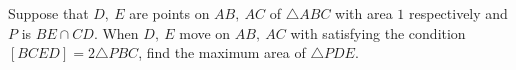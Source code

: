 Suppose that $ D,\ E$ are points on $ AB,\ AC$ of $ \triangle{ABC}$ with area $ 1$ respectively and $ P$ is $ BE\cap CD$. When $ D,\ E$ move on $ AB,\ AC$ with satisfying the condition $ [BCED] = 2\triangle{PBC}$, find the maximum area of $ \triangle{PDE}$.